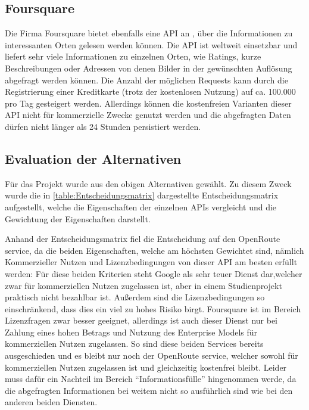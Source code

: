 \subsection{Foursquare}
Die Firma Foursquare bietet ebenfalls eine API an \cite{Foursquare.}, über die Informationen zu interessanten Orten gelesen werden können. Die API ist weltweit einsetzbar und liefert sehr viele Informationen zu einzelnen Orten, wie Ratings, kurze Beschreibungen oder Adressen von denen Bilder in der gewünschten Auflösung abgefragt werden können. Die Anzahl der möglichen Requests kann durch die Registrierung einer Kreditkarte (trotz der kostenlosen Nutzung) auf ca. 100.000 pro Tag gesteigert werden. Allerdings können die kostenfreien Varianten dieser API nicht für kommerzielle Zwecke genutzt werden und die abgefragten Daten dürfen nicht länger als 24 Stunden persistiert werden. 

\subsection{Evaluation der Alternativen}
Für das Projekt wurde aus den obigen Alternativen gewählt. Zu diesem Zweck wurde die in \autoref{table:Entscheidungsmatrix} dargestellte Entscheidungsmatrix aufgestellt, welche die Eigenschaften der einzelnen \acs{API}s vergleicht und die Gewichtung der Eigenschaften darstellt.

\vspace{0.25cm}

Anhand der Entscheidungsmatrix fiel die Entscheidung auf den OpenRoute service, da die beiden Eigenschaften, welche am höchsten Gewichtet sind, nämlich Kommerzieller Nutzen und Lizenzbedingungen von dieser \acs{API} am besten erfüllt werden: Für diese beiden Kriterien steht Google als sehr teuer Dienst dar,welcher zwar für kommerziellen Nutzen zugelassen ist, aber in einem Studienprojekt praktisch nicht bezahlbar ist. Außerdem sind die Lizenzbedingungen so einschränkend, dass dies ein viel zu hohes Risiko birgt. Foursquare ist im Bereich Lizenzfragen zwar besser geeignet, allerdings ist auch dieser Dienst nur bei Zahlung eines hohen Betrags und Nutzung des Enterprise Models für kommerziellen Nutzen zugelassen. So sind diese beiden Services bereits ausgeschieden und es bleibt nur noch der OpenRoute service, welcher sowohl für kommerziellen Nutzen zugelassen ist und gleichzeitig kostenfrei bleibt. Leider muss dafür ein Nachteil im Bereich \enquote{Informationsfülle} hingenommen werde, da die abgefragten Informationen bei weitem nicht so ausführlich sind wie bei den anderen beiden Diensten. 

